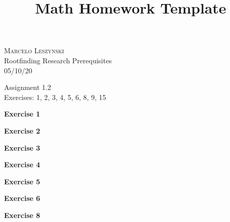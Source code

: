 \documentclass[12pt,oneside]{article}
\newenvironment{exercise}[1]{\vspace{.1in}\noindent\textbf{Exercise #1 \hspace{.05em}}}{}
\begin{document}
\title{Math Homework Template}

\begin{flushright}
\textsc{Marcelo Leszynski}  \\
Rootfinding Research Prerequisites \\
05/10/20
\end{flushright}

\begin{center}
\textsf{Assignment 1.2 } \\
\textsf{Exercises: 1, 2, 3, 4, 5, 6, 8, 9, 15}
\end{center}


\begin{exercise}{1}

\end{exercise}


\begin{exercise}{2}

\end{exercise}


\begin{exercise}{3}

\end{exercise}


\begin{exercise}{4}

\end{exercise}


\begin{exercise}{5}

\end{exercise}


\begin{exercise}{6}

\end{exercise}


\begin{exercise}{8}

\end{exercise}
\end{document}
